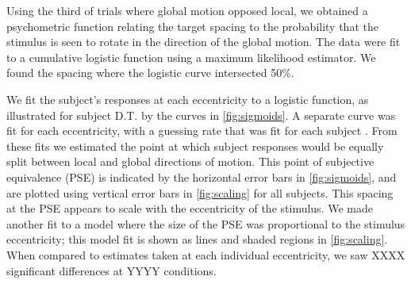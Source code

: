 \documentclass[../manuscript.tex]{subfiles}
\begin{document}
\begin{figure}
\begin{subfigure}[b]{.6\linewidth}
		\label{fig:scaling}
	\end{subfigure}
        \caption{}
        \label{fig:constant}
\end{figure}


Using the third of trials where global motion opposed local, we obtained a
psychometric function relating the target spacing to the probability
that the stimulus is seen to rotate in the direction of the global
motion. The data were fit to a cumulative logistic function using a
maximum likelihood estimator. We found the spacing where the
logistic curve intersected 50\%.

We fit the subject's responses at each eccentricity to a logistic function, as illustrated for subject D.T. by the curves in \autoref{fig:sigmoids}. A separate curve was fit for each eccentricity, with a guessing rate that was fit for each subject \citep{Wichmann:2001kx} . From these fits we estimated the point at which subject responses would be equally split between local and global directions of motion. This point of subjective equivalence (PSE)  is indicated by the horizontal error bars in \autoref{fig:sigmoids}, and are plotted using vertical error bars in \autoref{fig:scaling} for all subjects. This spacing at the PSE appears to scale with the eccentricity of the stimulus. We made another fit to a model where the size of the PSE was proportional to the stimulus eccentricity; this model fit is shown as lines and shaded regions in \autoref{fig:scaling}. When compared to estimates taken at each individual eccentricity, we saw XXXX significant differences at YYYY conditions. 
\end{document}
